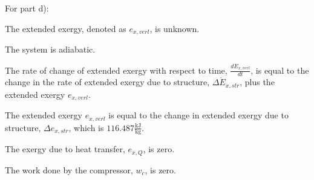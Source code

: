 For part d):

The extended exergy, denoted as \( e_{x,verl} \), is unknown.

The system is adiabatic.

The rate of change of extended exergy with respect to time, \( \frac{dE_{x,verl}}{dt} \), is equal to the change in the rate of extended exergy due to structure, \( \Delta \dot{E}_{x,str} \), plus the extended exergy \( e_{x,verl} \).

The extended exergy \( e_{x,verl} \) is equal to the change in extended exergy due to structure, \( \Delta e_{x,str} \), which is \( 116.487 \frac{\text{kJ}}{\text{kg}} \).

The exergy due to heat transfer, \( e_{x,Q} \), is zero.

The work done by the compressor, \( w_{c} \), is zero.